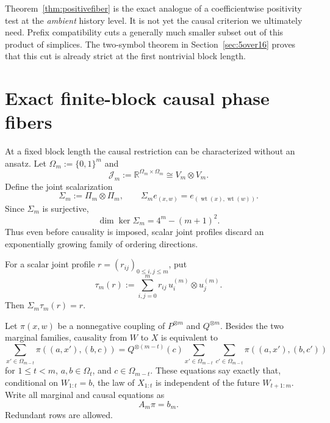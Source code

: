 \documentclass[11pt,a4paper]{article}
\theoremstyle{definition}
\theoremstyle{remark}
\newcommand{\R}{\mathbb R}
\newcommand{\bits}{\{0,1\}}
\newcommand{\wt}{\operatorname{wt}}
\begin{document}
Theorem~\ref{thm:positivefiber} is the exact analogue of a coefficientwise
positivity test at the \emph{ambient} history level.  It is not yet the causal
criterion we ultimately need.  Prefix compatibility cuts a generally much
smaller subset out of this product of simplices.  The two-symbol theorem in
Section~\ref{sec:5over16} proves that this cut is already strict at the
first nontrivial block length.

\section{Exact finite-block causal phase fibers}
\label{sec:causal-farkas}

At a fixed block length the causal restriction can be characterized without an
ansatz.  Let \(\Omega_m:=\bits^m\) and
\[
 \mathcal J_m:=\R^{\Omega_m\times\Omega_m}\cong V_m\otimes V_m.
\]
Define the joint scalarization
\begin{equation}
 \boxed{\Sigma_m:=\Pi_m\otimes\Pi_m,\qquad
 \Sigma_m e_{(x,w)}=e_{(\wt(x),\wt(w))}.}
 \label{eq:Sigmam}
\end{equation}
Since \(\Sigma_m\) is surjective,
\begin{equation}
 \boxed{\dim\ker\Sigma_m=4^m-(m+1)^2.}
 \label{eq:jointphase-dim}
\end{equation}
Thus even before causality is imposed, scalar joint profiles discard an
exponentially growing family of ordering directions.

For a scalar joint profile \(r=(r_{ij})_{0\le i,j\le m}\), put
\begin{equation}
 \boxed{\tau_m(r):=\sum_{i,j=0}^m r_{ij}\,u_i^{(m)}\otimes u_j^{(m)}.}
 \label{eq:taum}
\end{equation}
Then \(\Sigma_m\tau_m(r)=r\).

Let \(\pi(x,w)\) be a nonnegative coupling of \(P^{\otimes m}\) and
\(Q^{\otimes m}\).  Besides the two marginal families, causality from \(W\)
to \(X\) is equivalent to
\begin{equation}
 \boxed{
 \sum_{x'\in\Omega_{m-t}}\pi((a,x'),(b,c))
 =Q^{\otimes(m-t)}(c)
 \sum_{x'\in\Omega_{m-t}}\sum_{c'\in\Omega_{m-t}}
 \pi((a,x'),(b,c'))}
 \label{eq:generalcausality}
\end{equation}
for \(1\le t<m\), \(a,b\in\Omega_t\), and \(c\in\Omega_{m-t}\).  These
equations say exactly that, conditional on \(W_{1:t}=b\), the law of
\(X_{1:t}\) is independent of the future \(W_{t+1:m}\).  Write all marginal
and causal equations as
\begin{equation}
 A_m\pi=b_m.
 \label{eq:Am}
\end{equation}
Redundant rows are allowed.
\end{document}

